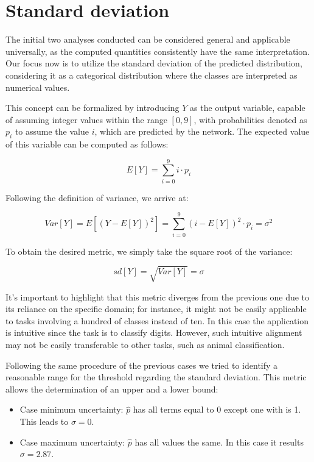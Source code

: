 \section{Standard deviation}

The initial two analyses conducted can be considered general and applicable universally, as the computed quantities consistently have the same interpretation. Our focus now is to utilize the standard deviation of the predicted distribution, considering it as a categorical distribution where the classes are interpreted as numerical values.

This concept can be formalized by introducing $Y$ as the output variable, capable of assuming integer values within the range $[0,9]$, with probabilities denoted as $p_i$ to assume the value $i$, which are predicted by the network. The expected value of this variable can be computed as follows:

\[
	E[Y] = \sum_{i=0}^{9} i \cdot p_i
\]

Following the definition of variance, we arrive at:

\[
	Var[Y] = E[(Y - E[Y])^2] = \sum_{i=0}^{9} (i - E[Y])^2 \cdot p_i = \sigma^2
\]

To obtain the desired metric, we simply take the square root of the variance:

\[
	sd[Y] = \sqrt{Var[Y]} = \sigma
\]

It's important to highlight that this metric diverges from the previous one due to its reliance on the specific domain; for instance, it might not be easily applicable to tasks involving a hundred of classes instead of ten. In this case the application is intuitive since the task is to classify digits. However, such intuitive alignment may not be easily transferable to other tasks, such as animal classification.

Following the same procedure of the previous cases we tried to identify a reasonable range for the threshold regarding the standard deviation. This metric allows the determination of an upper and a lower bound:

\begin{itemize}
	\item Case minimum uncertainty: $\hat{p}$ has all terms equal to 0 except one with is 1. This leads to $\sigma=0$.
	\item Case maximum uncertainty: $\hat{p}$ has all values the same. In this case it results $\sigma = 2.87$.
\end{itemize}

